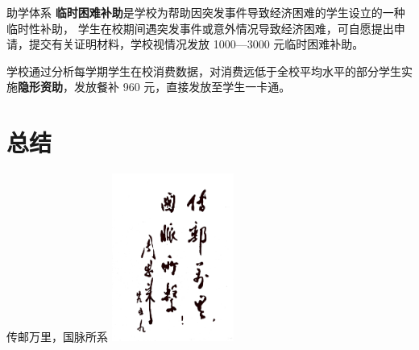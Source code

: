 \documentclass[aspectratio=169, utf8]{beamer}
\begin{document}
\begin{frame}{助学体系}
    \textcolor{Fore}{\textbf{临时困难补助}}是学校为帮助因突发事件导致经济困难的学生设立的一种临时性补助，
    学生在校期间遇突发事件或意外情况导致经济困难，可自愿提出申请，提交有关证明材料，学校视情况发放 1000—3000 元临时困难补助。

    学校通过分析每学期学生在校消费数据，对消费远低于全校平均水平的部分学生实施\textcolor{Fore}{\textbf{隐形资助}}，发放餐补 960 元，直接发放至学生一卡通。
\end{frame}

\section*{总结}

\begin{frame}{传邮万里，国脉所系}
    \centering
    \includegraphics[width=0.3\textwidth]{./resources/30.png}
\end{frame}
\end{document}
